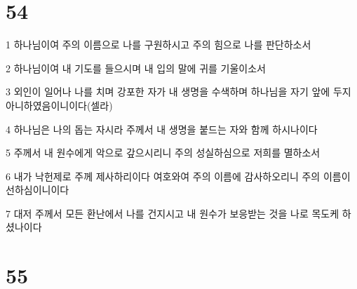 \chapter{54}

\par 1 하나님이여 주의 이름으로 나를 구원하시고 주의 힘으로 나를 판단하소서
\par 2 하나님이여 내 기도를 들으시며 내 입의 말에 귀를 기울이소서
\par 3 외인이 일어나 나를 치며 강포한 자가 내 생명을 수색하며 하나님을 자기 앞에 두지 아니하였음이니이다(셀라)
\par 4 하나님은 나의 돕는 자시라 주께서 내 생명을 붙드는 자와 함께 하시나이다
\par 5 주께서 내 원수에게 악으로 갚으시리니 주의 성실하심으로 저희를 멸하소서
\par 6 내가 낙헌제로 주께 제사하리이다 여호와여 주의 이름에 감사하오리니 주의 이름이 선하심이니이다
\par 7 대저 주께서 모든 환난에서 나를 건지시고 내 원수가 보응받는 것을 나로 목도케 하셨나이다

\chapter{55}

